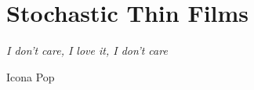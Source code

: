 \chapter{Stochastic Thin Films}\label{chapter:stochastic_thin_films}
\epigraph{\textit{I don't care, I love it, I don't care}}{Icona Pop}